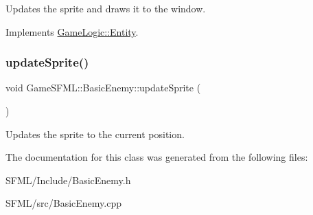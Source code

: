 Updates the sprite and draws it to the window. 

Implements \hyperlink{classGameLogic_1_1Entity_adf23a7036cb99dfc6e33434018131da4}{Game\+Logic\+::\+Entity}.

\mbox{\label{classGameSFML_1_1BasicEnemy_abd16a66e14ffd7067f6e397290a82198}} 
\subsubsection{\texorpdfstring{update\+Sprite()}{updateSprite()}}
{\footnotesize\ttfamily void Game\+S\+F\+M\+L\+::\+Basic\+Enemy\+::update\+Sprite (\begin{DoxyParamCaption}{ }\end{DoxyParamCaption})}

Updates the sprite to the current position. 

The documentation for this class was generated from the following files\+:\begin{DoxyCompactItemize}
\item 
S\+F\+M\+L/\+Include/Basic\+Enemy.\+h\item 
S\+F\+M\+L/src/Basic\+Enemy.\+cpp\end{DoxyCompactItemize}

